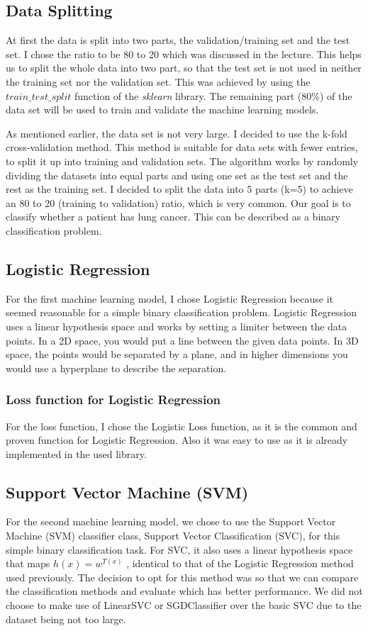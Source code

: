 \documentclass[a4paper,12pt]{article}
\begin{document}
\subsection{Data Splitting}
\label{sec:org9580541}
At first the data is split into two parts, the validation/training set and the test set. I chose the ratio to be 80 to 20 which was discussed in the lecture.
This helps us to split the whole data into two part, so that the test set is not used in neither the training set nor the validation set.
This was achieved by using the \(train\_test\_split\) function of the \emph{sklearn} library.
The remaining part (80\%) of the data set will be used to train and validate the machine learning models.

As mentioned earlier, the data set is not very large.
I decided to use the k-fold cross-validation method. This method is suitable for data sets with fewer entries, to split it up into training and validation sets.
The algorithm works by randomly dividing the datasets into equal parts and using one set as the test set and the rest as the training set.
I decided to split the data into 5 parts (k=5) to achieve an 80 to 20 (training to validation) ratio, which is very common.
Our goal is to classify whether a patient has lung cancer. This can be described as a binary classification problem.

\subsection{Logistic Regression}
\label{sec:org84fc7c9}
For the first machine learning model, I chose Logistic Regression because it seemed reasonable for a simple binary classification problem.
Logistic Regression uses a linear hypothesis space and works by setting a limiter between the data points.
In a 2D space, you would put a line between the given data points. In 3D space, the points would be separated by a plane, and in higher dimensions you would use a hyperplane to describe the separation.

\subsubsection{Loss function for Logistic Regression}
\label{sec:org72b30c4}
For the loss function, I chose the Logistic Loss function, as it is the common and proven function for Logistic Regression. Also it was easy to use as it is already implemented in the used library.

\subsection{Support Vector Machine (SVM)}
\label{sec:org9440bbc}
For the second machine learning model, we chose to use the Support Vector Machine (SVM) classifier class, Support Vector Classification (SVC), for this simple binary classification task. For SVC, it also uses a linear hypothesis space that maps \(h(x) = w^{T(x)}\) , identical to that of the Logistic Regression method used previously. The decision to opt for this method was so that we can compare the classification methods and evaluate which has better performance. We did not choose to make use of LinearSVC or SGDClassifier over the basic SVC due to the dataset being not too large.
\end{document}
